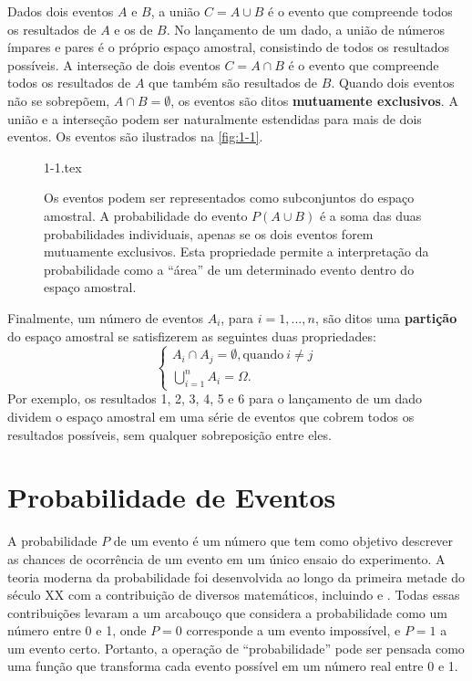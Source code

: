Dados dois eventos $A$ e $B$, a união $C = A \cup B$ é o evento que compreende todos os resultados de $A$ e os de $B$. No lançamento de um dado, a união de números ímpares e pares é o próprio espaço amostral, consistindo de todos os resultados possíveis. A interseção de dois eventos $C = A \cap B$ é o evento que compreende todos os resultados de $A$ que também são resultados de $B$. Quando dois eventos não se sobrepõem, $A \cap B = \emptyset$, os eventos são ditos \textbf{mutuamente exclusivos}. A união e a interseção podem ser naturalmente estendidas para mais de dois eventos. Os eventos são ilustrados na \autoref{fig:1-1}.

\begin{SCfigure}[\sidecaptionrelwidth][ht!]
	\centering
	{1-1.tex}
	\caption{Os eventos podem ser representados como subconjuntos do espaço amostral. A probabilidade do evento $P(A \cup B)$ é a soma das duas probabilidades individuais, apenas se os dois eventos forem mutuamente exclusivos. Esta propriedade permite a interpretação da probabilidade como a ``área'' de um determinado evento dentro do espaço amostral.}
	\label{fig:1-1}
\end{SCfigure}

Finalmente, um número de eventos $A_i$, para $i = 1, ..., n$, são ditos uma \textbf{partição} do espaço amostral se satisfizerem as seguintes duas propriedades:
\begin{equation}\label{1.1}
\begin{cases}
	A_i \cap A_j = \emptyset, \text{quando} \ i \neq j \\
	\bigcup_{i=1}^{n} A_i = \Omega.
\end{cases}
\end{equation}
Por exemplo, os resultados 1, 2, 3, 4, 5 e 6 para o lançamento de um dado dividem o espaço amostral em uma série de eventos que cobrem todos os resultados possíveis, sem qualquer sobreposição entre eles.

\section{Probabilidade de Eventos}

A probabilidade $P$ de um evento é um número que tem como objetivo descrever as chances de ocorrência de um evento em um único ensaio do experimento. A teoria moderna da probabilidade foi desenvolvida ao longo da primeira metade do século XX com a contribuição de diversos matemáticos, incluindo \citet{bernshtein1917} e \citet{kolmogorov1950foundations}. Todas essas contribuições levaram a um arcabouço que considera a probabilidade como um número entre 0 e 1, onde $P = 0$ corresponde a um evento impossível, e $P = 1$ a um evento certo. Portanto, a operação de ``probabilidade'' pode ser pensada como uma função que transforma cada evento possível em um número real entre 0 e 1.

